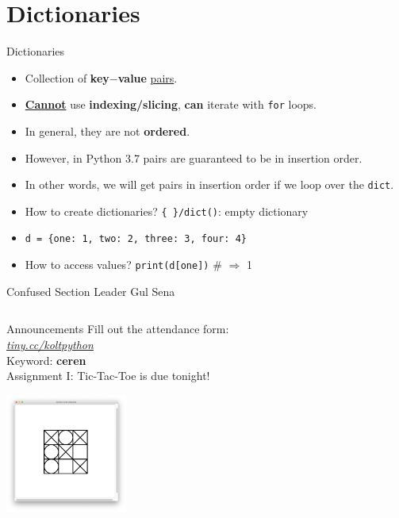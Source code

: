     \section{Dictionaries}
    \begin{frame}{Dictionaries}
        \Large
        \begin{itemize}
            \item Collection of \textbf{key$-$value} \underline{pairs}.
            \pause
            \item \underline{\textbf{Cannot}} use \textbf{indexing/slicing}, \textbf{can} iterate with \texttt{for} loops. 
            \pause
            \item In general, they are not \textbf{ordered}. 
            \pause
            \item However, in Python 3.7 pairs are guaranteed to be in insertion order.
            \pause
            \item In other words, we will get pairs in insertion order if we loop over the \texttt{dict}.
            \pause
            \item How to create dictionaries?
            \pause
             \texttt{\{\ \}/dict()}: empty dictionary
            \pause
            \item \texttt{d = \{\textquotesingle one\textquotesingle : 1, \textquotesingle two\textquotesingle : 2, \textquotesingle three\textquotesingle : 3, \textquotesingle four\textquotesingle : 4\}}
            \pause
            \item How to access values? 
            \pause
             \texttt{print(d[\textquotesingle one\textquotesingle ])} \# $\Rightarrow$ 1
        \end{itemize}
    \end{frame}

    \begin{frame}{Confused Section Leader Gul Sena}
        \inputminted[frame=single,framesep=2pt]{python3}{code-examples/dicts.py}
    \end{frame}


    \begin{frame}{Announcements}
        \LARGE
        Fill out the attendance form:\\
        \href{https://tiny.cc/koltpython}{\underline{\textit{tiny.cc/koltpython}}}\\
        Keyword: \textbf{ceren}\\
        \pause
        Assignment I: Tic-Tac-Toe is due tonight!
        
        \begin{center}
            \includegraphics[width=0.3\textwidth]{../Lecture5/images/end_game_figure.png}
        \end{center}
    
    \end{frame}

